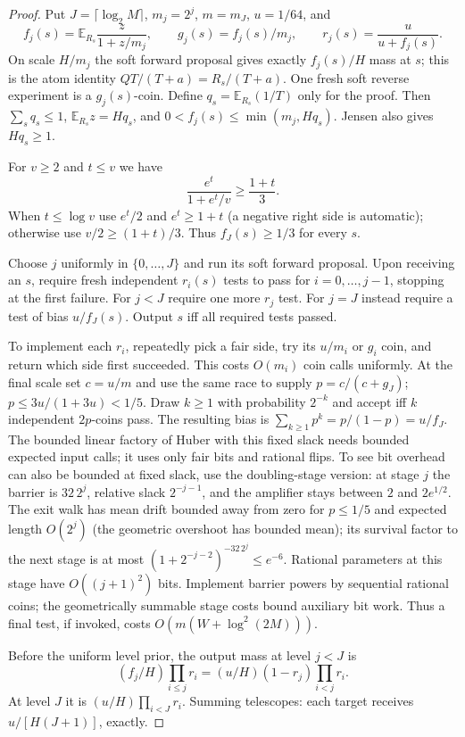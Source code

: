 \begin{proof}
Put $J=\lceil\log_2M\rceil$, $m_j=2^j$, $m=m_J$, $u=1/64$, and
\[
 f_j(s)=\mathbb E_{R_s}\frac{z}{1+z/m_j},\qquad
 g_j(s)=f_j(s)/m_j,\qquad r_j(s)=\frac{u}{u+f_j(s)} .
\]
On scale $H/m_j$ the soft forward proposal gives exactly $f_j(s)/H$
mass at $s$; this is the atom identity
$Q T/(T+a)=R_s/(T+a)$. One fresh soft reverse experiment is a
$g_j(s)$-coin. Define $q_s=\mathbb E_{R_s}(1/T)$ only for the proof.
Then $\sum_s q_s\le1$, $\mathbb E_{R_s}z=Hq_s$, and
$0<f_j(s)\le\min(m_j,Hq_s)$. Jensen also gives $Hq_s\ge1$.

For $v\ge2$ and $t\le v$ we have
\[
 \frac{e^t}{1+e^t/v}\ge \frac{1+t}{3}.
\]
When $t\le\log v$ use $e^t/2$ and $e^t\ge1+t$ (a negative right
side is automatic); otherwise use $v/2\ge(1+t)/3$. Thus
$f_J(s)\ge1/3$ for every $s$.

Choose $j$ uniformly in $\{0,\ldots,J\}$ and run its soft forward
proposal. Upon receiving an $s$, require fresh independent $r_i(s)$
tests to pass for $i=0,\ldots,j-1$, stopping at the first failure.
For $j<J$ require one more $r_j$ test. For $j=J$ instead require a
test of bias $u/f_J(s)$. Output $s$ iff all required tests passed.

To implement each $r_i$, repeatedly pick a fair side, try its
$u/m_i$ or $g_i$ coin, and return which side first succeeded. This
costs $O(m_i)$ coin calls uniformly. At the final scale set $c=u/m$
and use the same race to supply $p=c/(c+g_J)$; $p\le3u/(1+3u)<1/5$.
Draw $k\ge1$ with probability $2^{-k}$ and accept iff $k$ independent
$2p$-coins pass. The resulting bias is
$\sum_{k\ge1}p^k=p/(1-p)=u/f_J$. The bounded linear factory of
Huber \cite{Huber} with this fixed slack needs bounded expected input
calls; it uses only fair bits and rational flips. To see bit overhead
can also be bounded at fixed slack, use the doubling-stage version:
at stage $j$ the barrier is $32\,2^j$, relative slack $2^{-j-1}$,
and the amplifier stays between $2$ and $2e^{1/2}$. The exit walk has
mean drift bounded away from zero for $p\le1/5$ and expected length
$O(2^j)$ (the geometric overshoot has bounded mean); its survival
factor to the next stage is at most
$(1+2^{-j-2})^{-32\,2^j}\le e^{-6}$. Rational parameters at this
stage have $O((j+1)^2)$ bits. Implement barrier powers by sequential
rational coins; the geometrically summable stage costs bound auxiliary
bit work. Thus a final test, if invoked, costs $O(m(W+\log^2(2M)))$.

Before the uniform level prior, the output mass at level $j<J$ is
\[
 (f_j/H)\prod_{i\le j}r_i
     =(u/H)(1-r_j)\prod_{i<j}r_i.
\]
At level $J$ it is $(u/H)\prod_{i<J}r_i$. Summing telescopes:
each target receives $u/[H(J+1)]$, exactly.


\end{proof}
